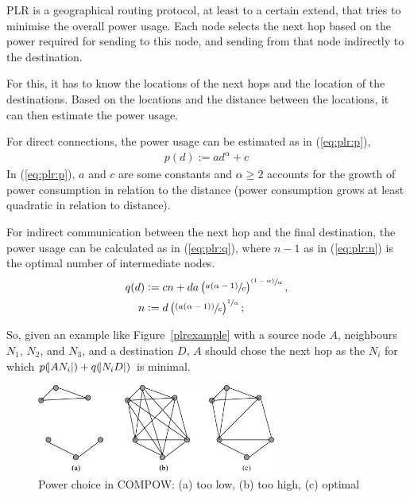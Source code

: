PLR\cite{stojmenovic2001power} is a geographical routing protocol, at least
to a certain extend, that tries to minimise the overall power usage. Each node
selects the next hop based on the power required for sending to this node, and
sending from that node indirectly to the destination.

For this, it has to know the locations of the next hops and the location of
the destinations. Based on the locations and the distance between the locations,
it can then estimate the power usage.

For direct connections, the power usage can be estimated as in (\ref{eq:plr:p}),
\begin{align}\label{eq:plr:p} p(d) := ad^{\alpha} + c \end{align}
In (\ref{eq:plr:p}), $a$ and $c$ are some constants and $\alpha \ge 2$ accounts
for the growth of power consumption in relation to the distance (power consumption
grows at least quadratic in relation to distance).

For indirect communication between the next hop and the final destination,
the power usage can be calculated as in (\ref{eq:plr:q}), where $n-1$ as in (\ref{eq:plr:n}) is the optimal number of intermediate nodes\cite{stojmenovic2001power}.
\begin{align}
  \label{eq:plr:q}
   q(d) &:= cn + da \left(\sfrac{a(\alpha - 1)}{c}\right)^{\sfrac{(1-\alpha)}{\alpha}}, \\
   \label{eq:plr:n}
      n &:= d\left(\sfrac{(a(\alpha - 1))}{c}\right)^{\sfrac{1}{\alpha}};
\end{align}

So, given an example like Figure~\ref{plrexample} with a source node $A$, neighbours $N_{1}$, $N_{2}$, and $N_{3}$, and a
destination $D$, $A$ should chose the next hop as the $N_{i}$ for which
$p(\abs{AN_{i}}) + q(\abs{N_{i}D})$ is minimal.

\begin{figure}
\centering
\includegraphics[width=0.7\textwidth]{images/compow-level-choice}
\caption{Power choice in COMPOW: (a) too low, (b) too high, (c) optimal}
\label{compow:power-choice}
\end{figure}

